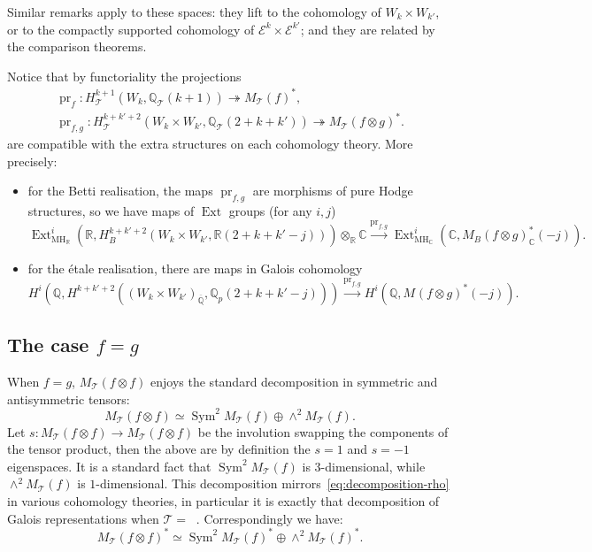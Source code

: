 \documentclass[11pt, a4paper, reqno]{amsart}
\theoremstyle{definition}
\theoremstyle{plain}
\theoremstyle{remark}
\DeclareMathOperator{\Sym}{Sym}
\DeclareMathOperator{\Ext}{Ext}
\DeclareMathOperator{\et}{\acute{e}t}
\DeclareMathOperator{\pr}{pr}
\newcommand{\numberset}{\mathbb}
\newcommand{\C}{\numberset{C}}
\newcommand{\Q}{\numberset{Q}}
\newcommand{\R}{\numberset{R}}
\newcommand{\Ell}{\mathcal{E}}
\newcommand{\theory}{\mathcal{T}}
\newcommand{\MH}{\mathrm{MH}}
\begin{document}
  Similar remarks apply to these spaces: they lift to the cohomology of $W_k \times W_{k'}$, or to the compactly supported cohomology of $\Ell^k \times \Ell^{k'}$; and they are related by the comparison theorems.

  Notice that by functoriality the projections
  \begin{gather*}
   \pr_f \colon H^{k+1}_{\theory}(W_k,\Q_{\theory}(k+1)) \twoheadrightarrow M_{\theory}(f)^*, \\
   \pr_{f,g} \colon H^{k+k'+2}_{\theory}(W_k\times W_{k'},\Q_{\theory}(2+k+k')) \twoheadrightarrow M_{\theory}(f\otimes g)^*.
  \end{gather*}
  are compatible with the extra structures on each cohomology theory. More precisely:

  \begin{itemize}
   \item for the Betti realisation, the maps $\pr_{f,g}$ are morphisms of pure Hodge structures, so we have maps of $\Ext$ groups (for any $i, j$)
    \[
     \Ext_{\MH_\R}^i(\R, H^{k+k'+2}_B(W_k\times W_{k'},\R(2+k+k' - j))) \otimes_{\R} \C
      \xrightarrow{\pr_{f,g}} \Ext^i_{\MH_\C}(\C, M_B(f\otimes g)_{\C}^*(-j)).
    \]
    \item for the \'etale realisation, there are maps in Galois cohomology
    \[
     H^i(\Q, H^{k+k'+2}_{\et}((W_k\!\times\! W_{k'})_{\overline{\Q}},\Q_p(2+k+k'-j))) \xrightarrow{\pr_{f,g}} H^i(\Q, M_{\et}(f\otimes g)^*(-j)).
    \]
  \end{itemize}

 \subsection{The case $f = g$}
  \label{sect:feqg}

  When $f=g$, $M_{\theory}(f\otimes f)$ enjoys the standard decomposition in symmetric and antisymmetric tensors:
  \[
   M_{\theory}(f\otimes f) \simeq \Sym^2 M_{\theory}(f) \oplus \wedge^2 M_{\theory}(f).
  \]
  Let $s \colon M_{\theory}(f\otimes f) \to M_{\theory}(f\otimes f)$ be the involution swapping the components of the tensor product, then the above are by definition the $s=1$ and $s=-1$ eigenspaces. It is a standard fact that $\Sym^2 M_{\theory}(f)$ is $3$-dimensional, while $\wedge^2 M_{\theory}(f)$ is $1$-dimensional. This decomposition mirrors~\eqref{eq:decomposition-rho} in various cohomology theories, in particular it is exactly that decomposition of Galois representations when $\theory = \et$. Correspondingly we have:
  \begin{equation}
   \label{eq:decomposition-m}
   M_{\theory}(f\otimes f)^* \simeq \Sym^2 M_{\theory}(f)^* \oplus \wedge^2 M_{\theory}(f)^*.
  \end{equation}
\end{document}

